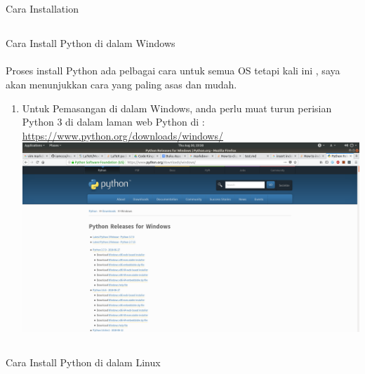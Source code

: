 \section{}
Cara Installation
\subsection{}
Cara Install Python di dalam Windows

\paragraph{}
Proses install Python ada pelbagai cara untuk semua OS tetapi kali ini , saya akan menunjukkan cara yang paling asas dan mudah.

\begin{enumerate}
	\item  Untuk Pemasangan di dalam Windows, anda perlu muat turun perisian Python 3 di dalam laman web Python di : \newline\newline
	\url{https://www.python.org/downloads/windows/}
\newline
\includegraphics[width=15cm]{./img/1.png}
\end{enumerate}
\subsection{}
Cara Install Python di dalam Linux
